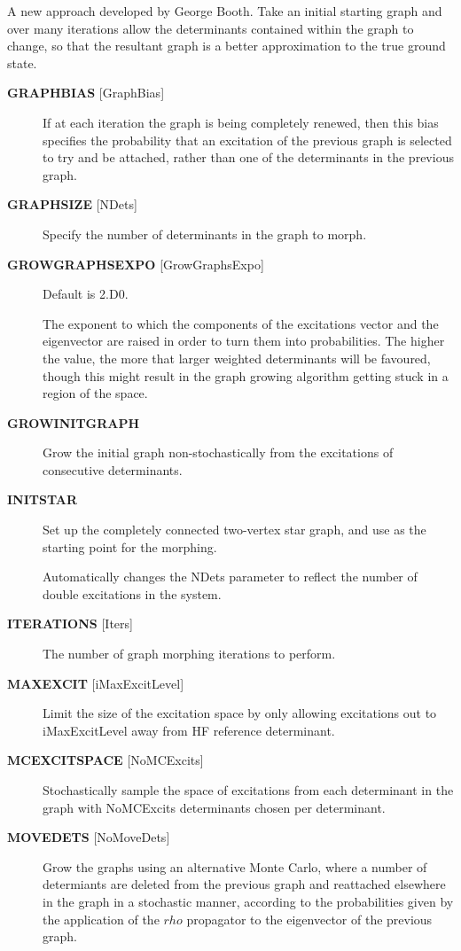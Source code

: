 \documentclass[openany,a4paper,10pt]{manual}
\begin{document}
A new approach developed by George Booth.  Take an initial starting graph
and over many iterations allow the determinants contained within the
graph to change, so that the resultant graph is a better approximation
to the true ground state.
\begin{description}
\item[\textbf{GRAPHBIAS} {[}GraphBias{]}]
If at each iteration the graph is being completely renewed, then this
bias specifies the probability that an excitation of the previous
graph is selected to try and be attached, rather than one of the
determinants in the previous graph.

\item[\textbf{GRAPHSIZE} {[}NDets{]}]
Specify the number of determinants in the graph to morph.

\item[\textbf{GROWGRAPHSEXPO} {[}GrowGraphsExpo{]}]
Default is 2.D0.

The exponent to which the components of the excitations vector
and the eigenvector are raised in order to turn them into
probabilities. The higher the value, the more that larger weighted
determinants will be favoured, though this might result in the graph
growing algorithm getting stuck in a region of the space.

\item[\textbf{GROWINITGRAPH}]
Grow the initial graph non-stochastically from the excitations of
consecutive determinants.

\item[\textbf{INITSTAR}]
Set up the completely connected two-vertex star graph, and use as
the starting point for the morphing.

Automatically changes the NDets parameter to reflect the number of
double excitations in the system.

\item[\textbf{ITERATIONS} {[}Iters{]}]
The number of graph morphing iterations to perform.

\item[\textbf{MAXEXCIT} {[}iMaxExcitLevel{]}]
Limit the size of the excitation space by only allowing excitations
out to iMaxExcitLevel away from HF reference determinant.

\item[\textbf{MCEXCITSPACE} {[}NoMCExcits{]}]
Stochastically sample the space of excitations from each determinant in the
graph with NoMCExcits determinants chosen per determinant.

\item[\textbf{MOVEDETS} {[}NoMoveDets{]}]
Grow the graphs using an alternative Monte Carlo, where a number
of determiants are deleted from the previous graph and reattached
elsewhere in the graph in a stochastic manner, according to the
probabilities given by the application of the $rho$ propagator
to the eigenvector of the previous graph.


\end{description}
\end{document}
